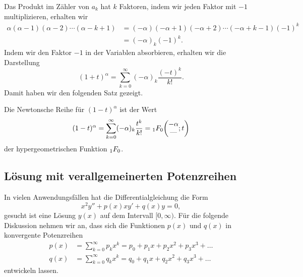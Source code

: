 Das Produkt im Zähler von $a_k$ hat $k$ Faktoren, indem wir jeden Faktor
mit $-1$ multiplizieren, erhalten wir
\begin{align*}
\alpha(\alpha-1)(\alpha-2)\cdots(\alpha-k+1)
&=
(-\alpha)(-\alpha+1)(-\alpha+2)\cdots(-\alpha+k-1) (-1)^k
\\
&=
(-\alpha)_k (-1)^k.
\end{align*}
Indem wir den Faktor $-1$ in der Variablen absorbieren, erhalten
wir die Darstellung
\[
(1+t)^\alpha
=
\sum_{k=0}^\infty
(-\alpha)_k\frac{(-t)^k}{k!}.
\]
Damit haben wir den folgenden Satz gezeigt.

\begin{satz}
%
\label{buch:differentialgleichungen:satz:newtonschereihe}
Die Newtonsche Reihe für $(1-t)^\alpha$ ist der Wert
\[
(1-t)^\alpha
=
\sum_{k=0}^\infty (-\alpha)_k \frac{t^k}{k!}
=
\mathstrut_1F_0\biggl(\begin{matrix}-\alpha\\\text{---}\end{matrix};t\biggr)
\]
der hypergeometrischen Funktion $\mathstrut_1F_0$.
\end{satz}

%
%
\subsection{Lösung mit verallgemeinerten Potenzreihen
\label{buch:differentialgleichungen:subsection:verallgemeinrt}}
In vielen Anwendungsfällen hat die Differentialgleichung die Form
\begin{equation}
x^2y'' + p(x)xy' + q(x)y = 0,
\label{buch:differentialgleichungen:eqn:dglverallg}
\end{equation}
gesucht ist eine Lösung $y(x)$ auf dem Intervall $[0,\infty)$.
Für die folgende Diskussion nehmen wir an, dass sich die Funktionen
$p(x)$ und $q(x)$ in konvergente Potenzreihen
\begin{align*}
p(x)&=\sum_{k=0}^\infty p_kx^k = p_0+p_1x+p_2x^2+p_3x^3+\dots
\\
q(x)&=\sum_{k=0}^\infty q_kx^k = q_0+q_1x+q_2x^2+q_3x^3+\dots
\end{align*}
entwickeln lassen.
%
%

%
%
